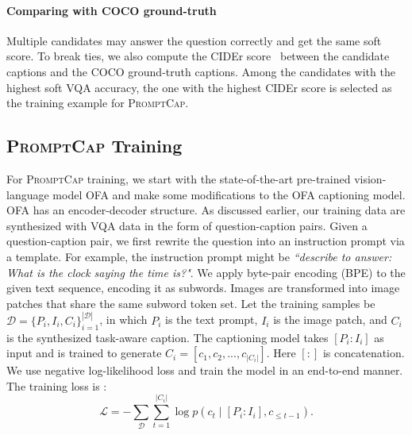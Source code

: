 \documentclass[10pt,twocolumn,letterpaper]{article}
\newcommand{\NAME}{\textsc{PromptCap}\xspace}
\begin{document}
\vspace{-0.1in}
\paragraph{Comparing with COCO ground-truth}
Multiple candidates may answer the question correctly and get the same soft score.
To break ties, we also compute the CIDEr score~\cite{vedantam2015cider} between the candidate captions and the COCO ground-truth captions.
Among the candidates with the highest soft VQA accuracy, the one with the highest CIDEr score is selected as the training example for \NAME.







\subsection{\NAME Training}
For \NAME training, we start with the state-of-the-art pre-trained vision-language model OFA \cite{wang2022ofa} and make some modifications to the OFA captioning model. 
OFA has an encoder-decoder structure.
As discussed earlier, our training data are synthesized with VQA data in the form of question-caption pairs.
Given a question-caption pair,
we first rewrite the question into an instruction prompt via a template.
For example, the instruction prompt might be
\textit{``describe to answer: What is the clock saying the time is?"}.
We apply byte-pair encoding (BPE) \cite{sennrich2015neural} to the given text sequence, encoding it as subwords.
Images are transformed into image patches that share the same subword token set.
Let the training samples be $\mathcal{D} = \{P_i, I_i, C_i\}_{i=1}^{|\mathcal{D}|}$, in which $P_i$ is the text prompt, $I_i$ is the image patch, and $C_i$ is the synthesized task-aware caption.
The captioning model takes $[P_i:I_i]$ as input and is trained to generate $C_i=[c_1, c_2, ... , c_{|C_i|}]$. Here $[:]$ is concatenation. We use negative log-likelihood loss and train the model in an end-to-end manner. The training loss is :
\begin{equation*}
\mathcal{L} =- \sum_{\mathcal{D}} \sum_{t=1}^{|C_i|} \log p (c_t\mid [P_i:I_i], c_{\leq t-1}).
\end{equation*}
\end{document}
